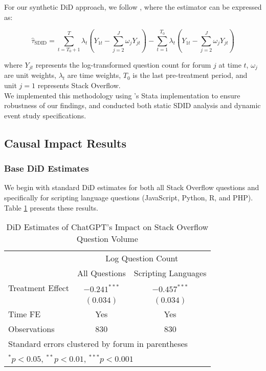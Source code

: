 For our synthetic DiD approach, we follow \textcite{arkhangelsky_synthetic_2021}, where the estimator can be expressed as:

\begin{equation}
\hat{\tau}_{\text{SDID}} = \sum_{t=T_0+1}^T \lambda_t \left( Y_{1t} - \sum_{j=2}^J \omega_j Y_{jt} \right) - \sum_{t=1}^{T_0} \lambda_t \left( Y_{1t} - \sum_{j=2}^J \omega_j Y_{jt} \right)
\end{equation}

where $Y_{jt}$ represents the log-transformed question count for forum $j$ at time $t$, $\omega_j$ are unit weights, $\lambda_t$ are time weights, $T_0$ is the last pre-treatment period, and unit $j=1$ represents Stack Overflow.\\

We implemented this methodology using \textcite{clarke_synthetic_2023}'s Stata implementation to ensure robustness of our findings, and conducted both static SDID analysis and dynamic event study specifications.

\subsection{Causal Impact Results}

\subsubsection{Base DiD Estimates}
We begin with standard DiD estimates for both all Stack Overflow questions and specifically for scripting language questions (JavaScript, Python, R, and PHP). Table \ref{tab:did_results} presents these results.

\begin{table}[htpb!]
    \centering
    \caption{DiD Estimates of ChatGPT's Impact on Stack Overflow Question Volume}
    \label{tab:did_results}
    \begin{tabular}{lcc}
        \toprule
            & \multicolumn{2}{c}{Log Question Count} \\
            \cmidrule(lr){2-3}
            & All Questions & Scripting Languages \\
        \midrule
            Treatment Effect      & $-0.241^{***}$  & $-0.457^{***}$ \\
            & $(0.034)$       & $(0.034)$ \\
        \midrule
            Time FE               & Yes             & Yes \\
            Observations          & 830             & 830 \\
        \bottomrule
            \multicolumn{3}{l}{\footnotesize Standard errors clustered by forum in parentheses} \\
            \multicolumn{3}{l}{\footnotesize $^{*}p<0.05$, $^{**}p<0.01$, $^{***}p<0.001$} \\
    \end{tabular}
\end{table}

